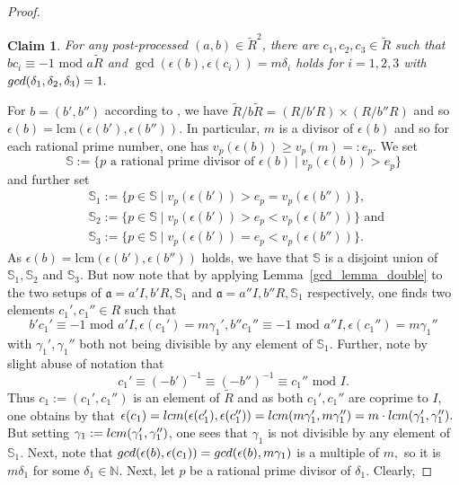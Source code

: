 \documentclass[12pt]{amsart}
\newtheorem{claim}{Claim}
\theoremstyle{definition}\newtheorem{definition}[theorem]{Definition}
\theoremstyle{remark}\newtheorem{remark}[theorem]{Remark}
\theoremstyle{definition}\newtheorem{case}{Case}
\begin{document}
\begin{proof}
\begin{claim}
For any post-processed $(a,b)\in\tilde{R}^2$, there are $c_1,c_2,c_3\in\tilde{R}$ such that $bc_i\equiv -1\text{ mod }a\tilde{R}$ and $\gcd(\epsilon(b),\epsilon(c_i))=m\delta_i$ holds for $i=1,2,3$ with ${\rm gcd}(\delta_1,\delta_2,\delta_3)=1.$
\end{claim}

For $b=(b',b'')$ according to \cite[Lemma~2.1]{gvozdevsky2023width}, we have $\tilde{R}/b\tilde{R}=(R/b'R)\times(R/b''R)$ and so $\epsilon(b)=\text{lcm}(\epsilon(b'),\epsilon(b'')).$ In particular, $m$ is a divisor of $\epsilon(b)$ and so for each rational prime number, one has $v_p(\epsilon(b))\geq v_p(m)=:e_p.$ We set
$$
\mathbb{S}:=\{p\text{ a rational prime divisor of }\epsilon(b)\mid v_p(\epsilon(b))>e_p\}
$$
and further set 
\begin{align*}
&\mathbb{S}_1:=\{p\in \mathbb{S}\mid v_p(\epsilon(b'))>e_p=v_p(\epsilon(b''))\},\\
&\mathbb{S}_2:=\{p\in \mathbb{S}\mid v_p(\epsilon(b'))>e_p<v_p(\epsilon(b''))\}\text{ and }\\
&\mathbb{S}_3:=\{p\in \mathbb{S}\mid v_p(\epsilon(b'))=e_p<v_p(\epsilon(b''))\}.
\end{align*}
As $\epsilon(b)=\text{lcm}(\epsilon(b'),\epsilon(b''))$ holds, we have that $\mathbb{S}$ is a disjoint union of $\mathbb{S}_1,\mathbb{S}_2$ and $\mathbb{S}_3.$ But now note that by applying Lemma~\ref{gcd_lemma_double} to the two setups of  $\mathfrak{a}=a'I,b'R,\mathbb{S}_1$ and $\mathfrak{a}=a''I,b''R,\mathbb{S}_1$ respectively, one finds two elements $c_1',c_1''\in R$ such that 
$$
b'c_1'\equiv -1\text{ mod }a'I,\epsilon(c_1')=m\gamma_1',b''c_1''\equiv -1\text{ mod }a''I,\epsilon(c_1'')=m\gamma_1''
$$
with $\gamma_1',\gamma_1''$ both not being divisible by any element of $\mathbb{S}_1.$ Further, note by slight abuse of notation that 
$$
c_1'\equiv (-b')^{-1}\equiv (-b'')^{-1}\equiv c_1''\text{ mod }I.
$$
Thus $c_1:=(c_1',c_1'')$ is an element of $\tilde{R}$ and as both $c_1',c_1''$ are coprime to $I$, one obtains by \cite[Lemma~2.1]{gvozdevsky2023width} that $\epsilon(c_1)={\rm lcm}(\epsilon(c'_1),\epsilon(c''_1))={\rm lcm}(m\gamma_1',m\gamma_1'')=m\cdot{\rm lcm}(\gamma_1',\gamma_1'').$ But setting $\gamma_1:={\rm lcm}(\gamma_1',\gamma_1'')$, one sees that $\gamma_1$ is not divisible by any element of $\mathbb{S}_1.$
Next, note that ${\rm gcd}(\epsilon(b),\epsilon(c_1))={\rm gcd}(\epsilon(b),m\gamma_1)$ is a multiple of $m,$ so it is $m\delta_1$ for some $\delta_1\in\mathbb{N}.$ Next, let $p$ be a rational prime divisor of $\delta_1$. Clearly, 

\end{proof}
\end{document}
